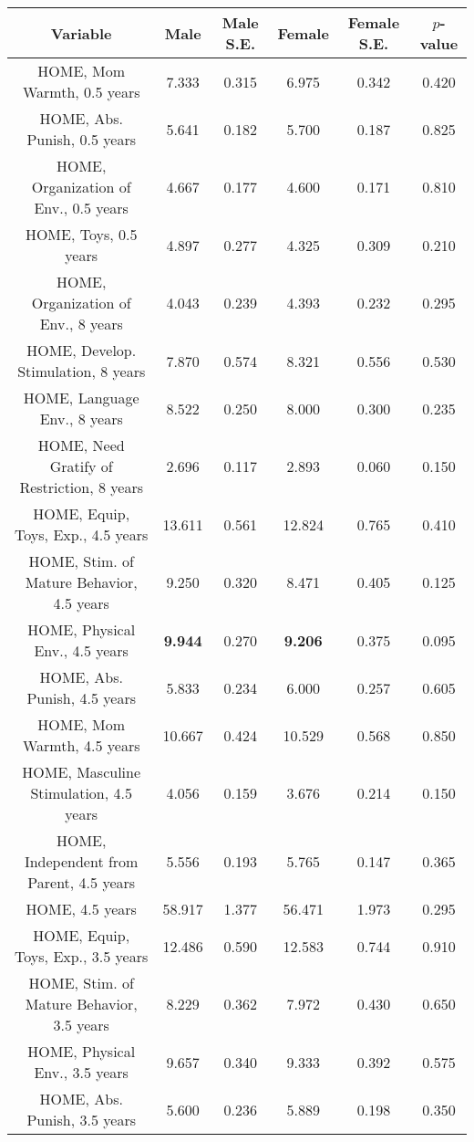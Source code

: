 \begin{longtable}{c c c c c c}
\toprule
\textbf{Variable} & \textbf{Male} & \textbf{Male S.E.}  & \textbf{Female} & \textbf{Female S.E.} & \textbf{$ p $-value} \\
\midrule
HOME, Mom Warmth, 0.5 years & 7.333 & 0.315 &  6.975 & 0.342 & 0.420 \\
HOME, Abs. Punish, 0.5 years & 5.641 & 0.182 &  5.700 & 0.187 & 0.825 \\
HOME, Organization of Env., 0.5 years & 4.667 & 0.177 &  4.600 & 0.171 & 0.810 \\
HOME, Toys, 0.5 years & 4.897 & 0.277 &  4.325 & 0.309 & 0.210 \\
HOME, Organization of Env., 8 years & 4.043 & 0.239 &  4.393 & 0.232 & 0.295 \\
HOME, Develop. Stimulation, 8 years & 7.870 & 0.574 &  8.321 & 0.556 & 0.530 \\
HOME, Language Env., 8 years & 8.522 & 0.250 &  8.000 & 0.300 & 0.235 \\
HOME, Need Gratify of Restriction, 8 years & 2.696 & 0.117 &  2.893 & 0.060 & 0.150 \\
HOME, Equip, Toys, Exp., 4.5 years & 13.611 & 0.561 &  12.824 & 0.765 & 0.410 \\
HOME, Stim. of Mature Behavior, 4.5 years & 9.250 & 0.320 &  8.471 & 0.405 & 0.125 \\
HOME, Physical Env., 4.5 years & \textbf{9.944} & 0.270 &  \textbf{9.206} & 0.375 & 0.095 \\
HOME, Abs. Punish, 4.5 years & 5.833 & 0.234 &  6.000 & 0.257 & 0.605 \\
HOME, Mom Warmth, 4.5 years & 10.667 & 0.424 &  10.529 & 0.568 & 0.850 \\
HOME, Masculine Stimulation, 4.5 years & 4.056 & 0.159 &  3.676 & 0.214 & 0.150 \\
HOME, Independent from Parent, 4.5 years & 5.556 & 0.193 &  5.765 & 0.147 & 0.365 \\
HOME, 4.5 years & 58.917 & 1.377 &  56.471 & 1.973 & 0.295 \\
HOME, Equip, Toys, Exp., 3.5 years & 12.486 & 0.590 &  12.583 & 0.744 & 0.910 \\
HOME, Stim. of Mature Behavior, 3.5 years & 8.229 & 0.362 &  7.972 & 0.430 & 0.650 \\
HOME, Physical Env., 3.5 years & 9.657 & 0.340 &  9.333 & 0.392 & 0.575 \\
HOME, Abs. Punish, 3.5 years & 5.600 & 0.236 &  5.889 & 0.198 & 0.350 \\

\end{longtable}
